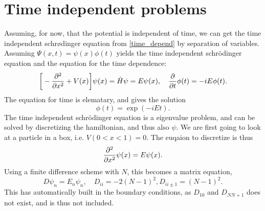 \documentclass{article}
\begin{document}
    \section*{Time independent problems}
    Assuming, for now, that the potential is independent of time, we can get the time independent schrødinger equation from \eqref{time_depend} by separation of variables. Assuming $\Psi(x, t) = \psi(x)\phi(t)$  yields the time independent schrödinger equation and the equation for the time dependence:
    \begin{equation}
        \bigg[-\pdv[2]{x} + V(x) \bigg] \psi(x) = \hat H \psi = E \psi(x), \quad \pdv{t}\phi(t) = -iE\phi(t).
    \end{equation}
    The equation for time is elematary, and gives the solution
    \begin{equation*}
        \phi(t) = \exp(-iEt).
    \end{equation*}
    The time independent schrödinger equation is a eigenvalue problem, and can be solved by discretizing the hamiltonian, and thus also $\psi$. We are first going to look at a particle in a box, i.e. $V(0<x<1) = 0$. The euqaion to discretize is thus
    \begin{equation*}
        \pdv[2]{x}\psi(x) = E \psi(x).
    \end{equation*}
    Using a finite difference scheme with $N$, this becomes a matrix equation,
    \begin{equation*}
        D \psi_n = E_n \psi_n, \quad D_{ii} = -2(N-1)^2, D_{ii\pm1} = (N-1)^2.
    \end{equation*}
    This has automatically built in the boundary conditions, as $D_{10}$ and $D_{NN+1}$ does not exist, and is thus not included.
\end{document}
